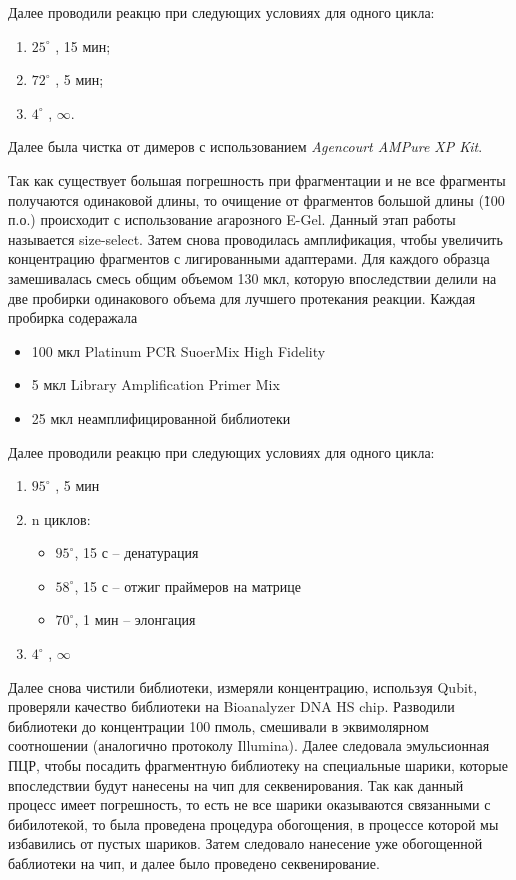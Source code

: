 Далее проводили реакцю при следующих условиях для одного цикла:

\begin{enumerate}
	\item $25^{\circ}$ , 15 мин;
	\item $72^{\circ}$ , 5 мин;
	\item $4^{\circ}$ ,  $\infty$.
\end{enumerate}

Далее была чистка от димеров с использованием \textit{Agencourt AMPure XP Kit}.

Так как существует большая погрешность при фрагментации и не все фрагменты получаются одинаковой длины, то очищение от фрагментов большой длины (\~100 п.о.) происходит с использование агарозного E-Gel. Данный этап работы называется size-select. Затем снова проводилась амплификация, чтобы увеличить концентрацию фрагментов с лигированными адаптерами. Для каждого образца замешивалась смесь общим объемом 130 мкл, которую впоследствии делили на две пробирки одинакового объема для лучшего протекания реакции. Каждая пробирка содеражала

\begin{itemize}
\item 100 мкл Platinum PCR SuoerMix High Fidelity
\item 5 мкл Library Amplification Primer Mix
\item 25 мкл неамплифицированной библиотеки
\end{itemize}

Далее проводили реакцю при следующих условиях для одного цикла:

\begin{enumerate}
	\item $95^{\circ}$ , 5 мин 
	\item n циклов:
	\begin{itemize}
		\item $95^{\circ}$, 15 с – денатурация
		\item $58^{\circ}$, 15 с – отжиг праймеров на матрице
		\item $70^{\circ}$, 1 мин – элонгация
	\end{itemize}
	\item $4^{\circ}$ ,  $\infty$
\end{enumerate}

Далее снова чистили библиотеки, измеряли концентрацию, используя Qubit, проверяли качество библиотеки на Bioanalyzer DNA HS chip. Разводили библиотеки до концентрации 100 пмоль, смешивали в эквимолярном соотношении (аналогично протоколу Illumina). Далее следовала эмульсионная ПЦР, чтобы посадить фрагментную библиотеку на специальные шарики, которые впоследствии будут нанесены на чип для секвенирования. Так как данный процесс имеет погрешность, то есть не все шарики оказываются связанными с бибилотекой, то была проведена процедура обогощения, в процессе которой мы избавились от пустых шариков. Затем следовало нанесение уже обогощенной баблиотеки на чип, и далее было проведено секвенирование. 


